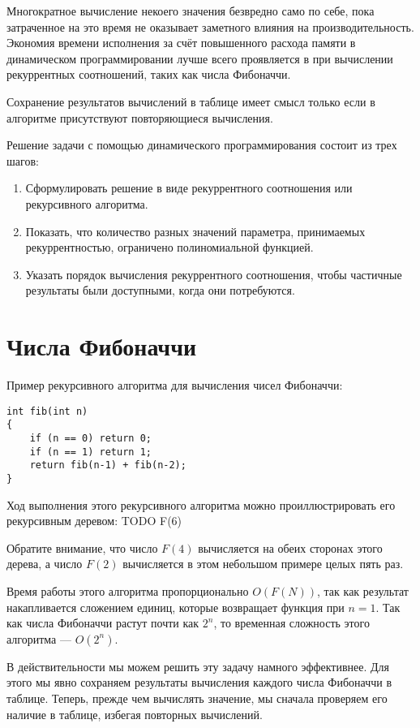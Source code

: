\documentclass[14pt,openany]{book}
\begin{document}
Многократное вычисление некоего значения безвредно само по себе, пока затраченное на это время
не оказывает заметного влияния на производительность. Экономия времени исполнения за счёт повышенного
расхода памяти в динамическом программировании лучше всего проявляется в при вычислении
рекуррентных соотношений, таких как числа Фибоначчи.

Сохранение результатов вычислений в таблице имеет смысл только если в алгоритме присутствуют
повторяющиеся вычисления. 

Решение задачи с помощью динамического программирования состоит из трех шагов:
\begin{enumerate}
\item Сформулировать решение в виде рекуррентного соотношения или рекурсивного алгоритма.
\item Показать, что количество разных значений параметра, принимаемых рекуррентностью,
      ограничено полиномиальной функцией.
\item Указать порядок вычисления рекуррентного соотношения, чтобы частичные результаты
      были доступными, когда они потребуются.
\end{enumerate}

\section{Числа Фибоначчи}

Пример рекурсивного алгоритма для вычисления чисел Фибоначчи:

\begin{lstlisting}
int fib(int n)
{
    if (n == 0) return 0;
    if (n == 1) return 1;
    return fib(n-1) + fib(n-2);
}
\end{lstlisting}

Ход выполнения этого рекурсивного алгоритма можно проиллюстрировать его рекурсивным
деревом: TODO F(6)

Обратите внимание, что число $F(4)$ вычисляется на обеих сторонах этого дерева, а число
$F(2)$ вычисляется в этом небольшом примере целых пять раз.

Время работы этого алгоритма пропорционально $O(F(N))$, так как результат накапливается
сложением единиц, которые возвращает функция при $n=1$. Так как числа Фибоначчи растут почти
как $2^n$, то временная сложность этого алгоритма --- $O(2^n)$.

В действительности мы можем решить эту задачу намного эффективнее. Для этого мы явно сохраняем
результаты вычисления каждого числа Фибоначчи в таблице. Теперь, прежде чем вычислять
значение, мы сначала проверяем его наличие в таблице, избегая повторных вычислений.
\end{document}
